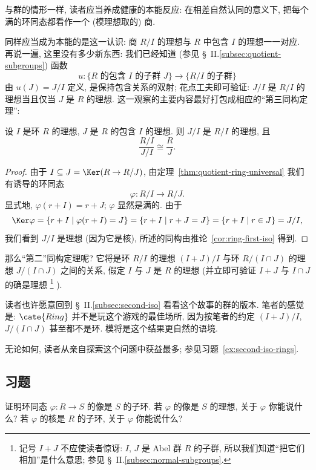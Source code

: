 与群的情形一样, 读者应当养成健康的本能反应: 在相差自然认同的意义下, 把每个满的环同态都看作一个 (模理想取的) 商.

同样应当成为本能的是这一认识: 商 $R/I$ 的理想与 $R$ 中包含 $I$ 的理想一一对应. 再说一遍, 这里没有多少新东西: 我们已经知道 (参见 \S~II.\ref{subsec:quotient-subgroups}) 函数
\[
u : \{\text{$R$ 的包含 } I \text{ 的子群 } J\} \to \{\text{$R/I$ 的子群}\}
\]
由 $u(J) = J/I$ 定义, 是保持包含关系的双射; 花点工夫即可验证: $J/I$ 是 $R/I$ 的理想当且仅当 $J$ 是 $R$ 的理想. 这一观察的主要内容最好打包成相应的``第三同构定理'':

\begin{proposition}
\label{prop:ring-third-iso}
设 $I$ 是环 $R$ 的理想, $J$ 是 $R$ 的包含 $I$ 的理想. 则 $J/I$ 是 $R/I$ 的理想, 且
\[
\frac{R/I}{J/I} \cong \frac{R}{J}.
\]
\end{proposition}

\begin{proof}
由于 $I \subseteq J = \Ker(R \to R/J)$, 由定理~\ref{thm:quotient-ring-universal} 我们有诱导的环同态
\[
\varphi : R/I \to R/J.
\]
显式地, $\varphi(r + I) = r + J$; $\varphi$ 显然是满的. 由于
\[
\Ker \varphi = \{r + I \mid \varphi(r + I) = J\} = \{r + I \mid r + J = J\} = \{r + I \mid r \in J\} = J/I,
\]
我们看到 $J/I$ 是理想 (因为它是核), 所述的同构由推论~\ref{cor:ring-first-iso} 得到.
\end{proof}

那么``第二''同构定理呢? 它将是环 $R/I$ 的理想 $(I + J)/I$ 与环 $R/(I \cap J)$ 的理想 $J/(I \cap J)$ 之间的关系, 假定 $I$ 与 $J$ 是 $R$ 的理想 (并立即可验证 $I + J$ 与 $I \cap J$ 的确是理想%
\footnote{记号 $I + J$ 不应使读者惊讶: $I$, $J$ 是 Abel 群 $R$ 的子群, 所以我们知道``把它们相加''是什么意思; 参见 \S~II.\ref{subsec:normal-subgroups}.}%
).

读者也许愿意回到 \S~II.\ref{subsec:second-iso} 看看这个故事的群的版本. 笔者的感觉是: $\cate{Ring}$ 并不是玩这个游戏的最佳场所, 因为按笔者的约定 $(I + J)/I$, $J/(I \cap J)$ 甚至都不是环. 模将是这个结果更自然的语境.

无论如何, 读者从亲自探索这个问题中获益最多; 参见习题~\ref{ex:second-iso-rings}.

\subsection*{习题}
{}

\begin{prob}
\label{ex:image-subring}
证明环同态 $\varphi : R \to S$ 的像是 $S$ 的子环. 若 $\varphi$ 的像是 $S$ 的理想, 关于 $\varphi$ 你能说什么? 若 $\varphi$ 的核是 $R$ 的子环, 关于 $\varphi$ 你能说什么?
\end{prob}


